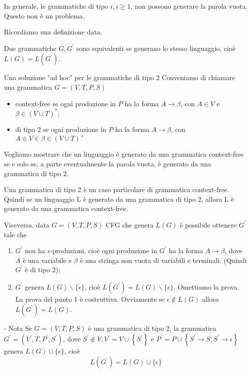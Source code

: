 In generale, le grammatiche di tipo $i, i \geq 1$, non possono generare la parola vuota. Questo non è un problema.

Ricordiamo una definizione data.

Due grammatiche $G, G^{\prime}$ sono equivalenti se generano lo stesso linguaggio, cioè $L(G)=L\left(G^{\prime}\right)$.

\vspace{5mm}

Una soluzione "ad hoc" per le grammatiche di tipo 2
Conveniamo di chiamare una grammatica $G=(V, T, P, S)$
\begin{itemize}
    \item context-free se ogni produzione in $P$ ha la forma $A \rightarrow \beta$, con $A \in V$ e $\beta \in(V \cup T)^{*}$;
    \item di tipo 2 se ogni produzione in $P$ ha la forma $A \rightarrow \beta$, con $A \in V \in \beta \in(V \cup T)^{+}$
\end{itemize}

Vogliamo mostrare che un linguaggio è generato da una grammatica context-free se e solo se, a parte eventualmente la parola vuota, è generato da una grammatica di tipo $2 .$

Una grammatica di tipo 2 è un caso particolare di grammatica
context-free. Quindi se un linguaggio L è generato da una
grammatica di tipo 2, allora L è generato da una grammatica
context-free.

Viceversa, data $G=(V, T, P, S)$ CFG che genera $L(G)$ è possibile ottenere $G^{\prime}$ tale che
\begin{enumerate}
    \item $G^{\prime}$ non ha $\epsilon$-produzioni, cioè ogni produzione in $G^{\prime}$ ha la forma $A \rightarrow \beta$, dove $A$ è una variabile e $\beta$ è una stringa non vuota di variabili e terminali. (Quindi $G^{\prime}$ è di tipo 2);
    \item $G^{\prime}$ genera $L(G) \backslash\{\epsilon\}$, cioè $L\left(G^{\prime}\right)=L(G) \backslash\{\epsilon\}$.
Omettiamo la prova. La prova del punto 1 è costruttiva. Ovviamente se $\epsilon \notin L(G)$ allora $L\left(G^{\prime}\right)=L(G)$.
\end{enumerate}

- Nota Se $G=(V, T, P, S)$ è una grammatica di tipo 2, la grammatica $G^{\prime}=\left(V^{\prime}, T, P^{\prime}, S^{\prime}\right)$, dove $S^{\prime} \notin V, V^{\prime}=V \cup\left\{S^{\prime}\right\}$ e $P^{\prime}=P \cup\left\{S^{\prime} \rightarrow S, S^{\prime} \rightarrow \epsilon\right\}$ genera $L(G) \cup\{\epsilon\}$, cioè
$$
L\left(G^{\prime}\right)=L(G) \cup\{\epsilon\}
$$


